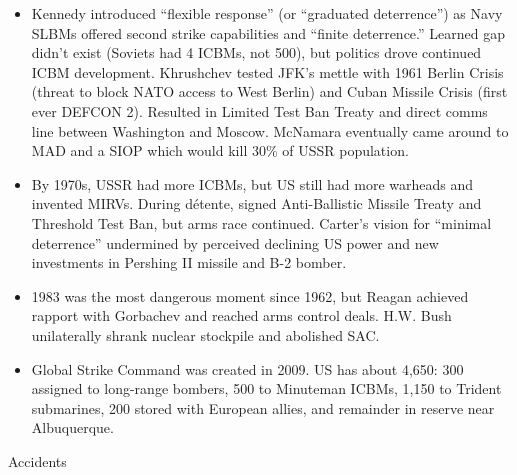 \documentclass[
]{article}
\begin{document}
\begin{itemize}
\item
  Kennedy introduced ``flexible response'' (or ``graduated deterrence'')
  as Navy SLBMs offered second strike capabilities and ``finite
  deterrence.'' Learned gap didn't exist (Soviets had 4 ICBMs, not 500),
  but politics drove continued ICBM development. Khrushchev tested JFK's
  mettle with 1961 Berlin Crisis (threat to block NATO access to West
  Berlin) and Cuban Missile Crisis (first ever DEFCON 2). Resulted in
  Limited Test Ban Treaty and direct comms line between Washington and
  Moscow. McNamara eventually came around to MAD and a SIOP which would
  kill 30\% of USSR population.
\item
  By 1970s, USSR had more ICBMs, but US still had more warheads and
  invented MIRVs. During détente, signed Anti-Ballistic Missile Treaty
  and Threshold Test Ban, but arms race continued. Carter's vision for
  ``minimal deterrence'' undermined by perceived declining US power and
  new investments in Pershing II missile and B-2 bomber.
\item
  1983 was the most dangerous moment since 1962, but Reagan achieved
  rapport with Gorbachev and reached arms control deals. H.W. Bush
  unilaterally shrank nuclear stockpile and abolished SAC.
\item
  Global Strike Command was created in 2009. US has about 4,650: 300
  assigned to long-range bombers, 500 to Minuteman ICBMs, 1,150 to
  Trident submarines, 200 stored with European allies, and remainder in
  reserve near Albuquerque.
\end{itemize}

Accidents
\end{document}
